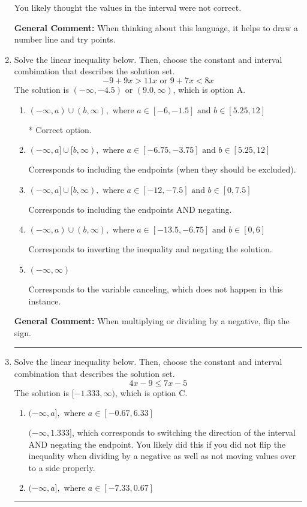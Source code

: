 \documentclass{extbook}[14pt]
\newcommand{\litem}[1]{\item #1

\rule{\textwidth}{0.4pt}}
\begin{document}
\begin{enumerate}
{\begin{enumerate}[label=\Alph*.]
You likely thought the values in the interval were not correct.
\end{enumerate}

\textbf{General Comment:} When thinking about this language, it helps to draw a number line and try points.
}
\litem{
Solve the linear inequality below. Then, choose the constant and interval combination that describes the solution set.
\[ -9 + 9 x > 11 x \text{ or } 9 + 7 x < 8 x \]The solution is \( (-\infty, -4.5) \text{ or } (9.0, \infty) \), which is option A.\begin{enumerate}[label=\Alph*.]
\item \( (-\infty, a) \cup (b, \infty), \text{ where } a \in [-6, -1.5] \text{ and } b \in [5.25, 12] \)

 * Correct option.
\item \( (-\infty, a] \cup [b, \infty), \text{ where } a \in [-6.75, -3.75] \text{ and } b \in [5.25, 12] \)

Corresponds to including the endpoints (when they should be excluded).
\item \( (-\infty, a] \cup [b, \infty), \text{ where } a \in [-12, -7.5] \text{ and } b \in [0, 7.5] \)

Corresponds to including the endpoints AND negating.
\item \( (-\infty, a) \cup (b, \infty), \text{ where } a \in [-13.5, -6.75] \text{ and } b \in [0, 6] \)

Corresponds to inverting the inequality and negating the solution.
\item \( (-\infty, \infty) \)

Corresponds to the variable canceling, which does not happen in this instance.
\end{enumerate}

\textbf{General Comment:} When multiplying or dividing by a negative, flip the sign.
}
\litem{
Solve the linear inequality below. Then, choose the constant and interval combination that describes the solution set.
\[ 4x -9 \leq 7x -5 \]The solution is \( [-1.333, \infty) \), which is option C.\begin{enumerate}[label=\Alph*.]
\item \( (-\infty, a], \text{ where } a \in [-0.67, 6.33] \)

 $(-\infty, 1.333]$, which corresponds to switching the direction of the interval AND negating the endpoint. You likely did this if you did not flip the inequality when dividing by a negative as well as not moving values over to a side properly.
\item \( (-\infty, a], \text{ where } a \in [-7.33, 0.67] \)


\end{enumerate}}
\end{enumerate}
\end{document}
